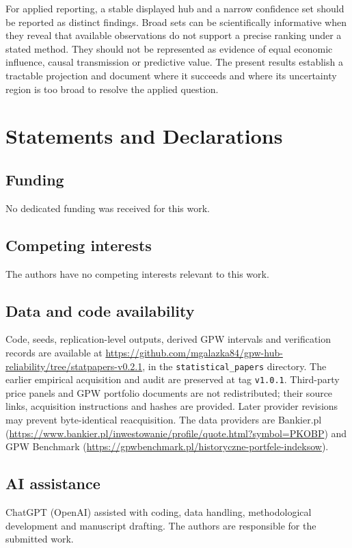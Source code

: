 \documentclass[pdflatex,sn-mathphys-ay]{sn-jnl}
\theoremstyle{thmstyleone}
\theoremstyle{thmstyletwo}
\begin{document}
For applied reporting, a stable displayed hub and a narrow confidence set should be reported as distinct findings. Broad sets can be scientifically informative when they reveal that available observations do not support a precise ranking under a stated method. They should not be represented as evidence of equal economic influence, causal transmission or predictive value. The present results establish a tractable projection and document where it succeeds and where its uncertainty region is too broad to resolve the applied question.

\section*{Statements and Declarations}
\subsection*{Funding}
No dedicated funding was received for this work.
\subsection*{Competing interests}
The authors have no competing interests relevant to this work.
\subsection*{Data and code availability}
Code, seeds, replication-level outputs, derived GPW intervals and verification records are available at \url{https://github.com/mgalazka84/gpw-hub-reliability/tree/statpapers-v0.2.1}, in the \texttt{statistical\_papers} directory. The earlier empirical acquisition and audit are preserved at tag \texttt{v1.0.1}. Third-party price panels and GPW portfolio documents are not redistributed; their source links, acquisition instructions and hashes are provided. Later provider revisions may prevent byte-identical reacquisition. The data providers are Bankier.pl (\url{https://www.bankier.pl/inwestowanie/profile/quote.html?symbol=PKOBP}) and GPW Benchmark (\url{https://gpwbenchmark.pl/historyczne-portfele-indeksow}).
\subsection*{AI assistance}
ChatGPT (OpenAI) assisted with coding, data handling, methodological development and manuscript drafting. The authors are responsible for the submitted work.

\nocite{*}

\end{document}
